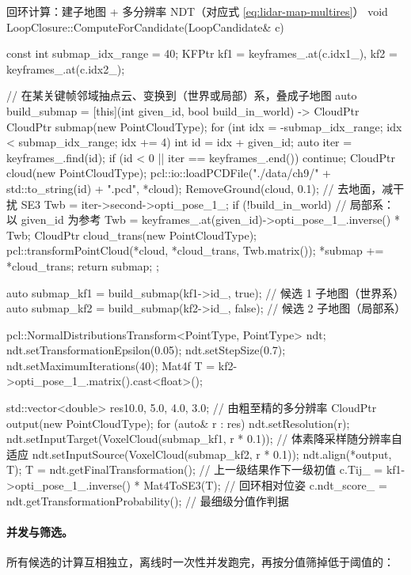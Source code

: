 \begin{codebox}[C++]{回环计算：建子地图 + 多分辨率 NDT（对应式 \ref{eq:lidar-map-multires}）}
void LoopClosure::ComputeForCandidate(LoopCandidate& c) {
  const int submap_idx_range = 40;
  KFPtr kf1 = keyframes_.at(c.idx1_), kf2 = keyframes_.at(c.idx2_);

  // 在某关键帧邻域抽点云、变换到（世界或局部）系，叠成子地图
  auto build_submap = [this](int given_id, bool build_in_world) -> CloudPtr {
    CloudPtr submap(new PointCloudType);
    for (int idx = -submap_idx_range; idx < submap_idx_range; idx += 4) {
      int id = idx + given_id;
      auto iter = keyframes_.find(id);
      if (id < 0 || iter == keyframes_.end()) continue;
      CloudPtr cloud(new PointCloudType);
      pcl::io::loadPCDFile("./data/ch9/" + std::to_string(id) + ".pcd", *cloud);
      RemoveGround(cloud, 0.1);                       // 去地面，减干扰
      SE3 Twb = iter->second->opti_pose_1_;
      if (!build_in_world)                            // 局部系：以 given_id 为参考
        Twb = keyframes_.at(given_id)->opti_pose_1_.inverse() * Twb;
      CloudPtr cloud_trans(new PointCloudType);
      pcl::transformPointCloud(*cloud, *cloud_trans, Twb.matrix());
      *submap += *cloud_trans;
    }
    return submap;
  };

  auto submap_kf1 = build_submap(kf1->id_, true);     // 候选 1 子地图（世界系）
  auto submap_kf2 = build_submap(kf2->id_, false);    // 候选 2 子地图（局部系）

  pcl::NormalDistributionsTransform<PointType, PointType> ndt;
  ndt.setTransformationEpsilon(0.05);
  ndt.setStepSize(0.7);
  ndt.setMaximumIterations(40);
  Mat4f T = kf2->opti_pose_1_.matrix().cast<float>();

  std::vector<double> res{10.0, 5.0, 4.0, 3.0};       // 由粗至精的多分辨率
  CloudPtr output(new PointCloudType);
  for (auto& r : res) {
    ndt.setResolution(r);
    ndt.setInputTarget(VoxelCloud(submap_kf1, r * 0.1)); // 体素降采样随分辨率自适应
    ndt.setInputSource(VoxelCloud(submap_kf2, r * 0.1));
    ndt.align(*output, T);
    T = ndt.getFinalTransformation();                 // 上一级结果作下一级初值
  }
  c.Tij_       = kf1->opti_pose_1_.inverse() * Mat4ToSE3(T); // 回环相对位姿
  c.ndt_score_ = ndt.getTransformationProbability();   // 最细级分值作判据
}
\end{codebox}

\paragraph{并发与筛选。}
所有候选的计算互相独立，离线时一次性并发跑完，再按分值筛掉低于阈值的：

